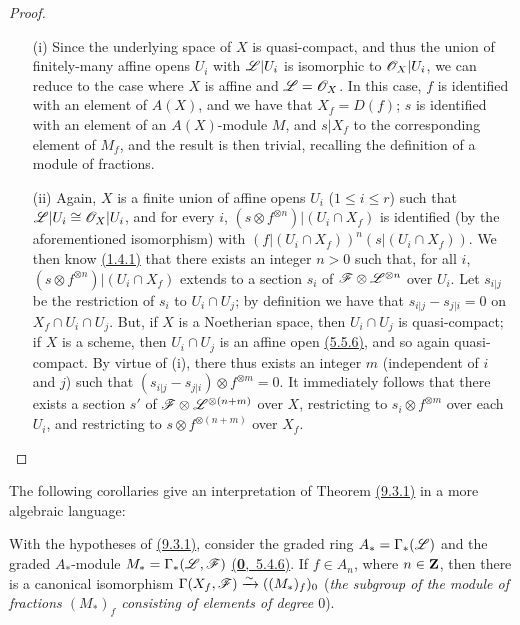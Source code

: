 \begin{proof}
\label{proof-thm-1.9.3.1}
\medskip\noindent
\begin{itemize}
  \item[(i)] Since the underlying space of $X$ is quasi-compact, and thus the union of
    finitely-many affine opens $U_i$ with $\mathscr{L}|U_i$ is isomorphic to
    $\mathscr{O}_X|U_i$, we can reduce to the case where $X$ is affine and $\mathscr{L}=\mathscr{O}_X$.
    In this case, $f$ is identified with an element of $A(X)$, and we have that
    $X_f=D(f)$; $s$ is identified with an element of an $A(X)$-module $M$, and
    $s|X_f$ to the corresponding element of $M_f$, and the result is then trivial,
    recalling the definition of a module of fractions.
  \item[(ii)] Again, $X$ is a finite union of affine opens $U_i$ ($1\leqslant i\leqslant r$)
    such that $\mathscr{L}|U_i\cong\mathscr{O}_X|U_i$, and for every $i$,
    $(s\otimes f^{\otimes n})|(U_i\cap X_f)$ is identified (by the aforementioned
    isomorphism) with $(f|(U_i\cap X_f))^n(s|(U_i\cap X_f))$. We then know
    \hyperref[thm-1.1.4.1]{(1.4.1)} that there exists an integer $n>0$ such that, for all
    $i$, $(s\otimes f^{\otimes n})|(U_i\cap X_f)$ extends to a section $s_i$ of
    $\mathscr{F}\otimes\mathscr{L}^{\otimes n}$ over $U_i$. Let $s_{i|j}$ be the restriction
    of $s_i$ to $U_i\cap U_j$; by definition we have that $s_{i|j}-s_{j|i}=0$ on
    $X_f\cap U_i\cap U_j$. But, if $X$ is a Noetherian space, then $U_i\cap U_j$ is
    quasi-compact; if $X$ is a scheme, then $U_i\cap U_j$ is an affine open
    \hyperref[env-1.5.5.6]{(5.5.6)}, and so again quasi-compact. By virtue of (i), there thus
    exists an integer $m$ (independent of $i$ and $j$) such that
    $(s_{i|j}-s_{j|i})\otimes f^{\otimes m}=0$. It immediately follows that there
    exists a section $s'$ of $\mathscr{F}\otimes\mathscr{L}^{\otimes(n+m)}$ over $X$,
    restricting to $s_i\otimes f^{\otimes m}$ over each $U_i$, and restricting to
    $s\otimes f^{\otimes(n+m)}$ over $X_f$.
\end{itemize}
\end{proof}

The following corollaries give an interpretation of Theorem \hyperref[thm-1.9.3.1]{(9.3.1)} in a more
algebraic language:
\begin{cor}[9.3.2]
\label{cor-1.9.3.2}
With the hypotheses of \hyperref[thm-1.9.3.1]{(9.3.1)}, consider the graded ring $A_*=\Gamma_*(\mathscr{L})$
and the graded $A_*$-module $M_*=\Gamma_*(\mathscr{L},\mathscr{F})$ \hyperref[env-0.5.4.6]{(\textbf{0},~5.4.6)}. If $f\in A_n$,
where $n\in\mathbf{Z}$, then there is a canonical isomorphism
$\Gamma(X_f,\mathscr{F})\xrightarrow{\sim}((M_*)_f)_0$ ({\em the subgroup of the module of
fractions $(M_*)_f$ consisting of elements of degree $0$}).
\end{cor}

